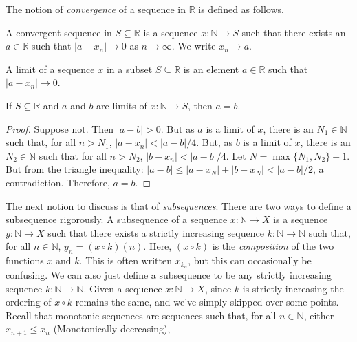     The notion of \textit{convergence} of a sequence
    in $\mathbb{R}$ is defined as follows.
    \begin{definition}
        A convergent sequence in $S\subseteq\mathbb{R}$
        is a sequence $x:\mathbb{N}\rightarrow{S}$
        such that there exists an $a\in\mathbb{R}$
        such that $|a-x_{n}|\rightarrow{0}$ as
        $n\rightarrow\infty$. We write
        $x_{n}\rightarrow{a}$.
    \end{definition}
    \begin{definition}
        A limit of a sequence $x$
        in a subset $S\subseteq\mathbb{R}$ is an
        element $a\in\mathbb{R}$ such that
        $|a-x_{n}|\rightarrow{0}$.
    \end{definition}
    \begin{theorem}
        If $S\subseteq\mathbb{R}$ and $a$ and $b$ are
        limits of $x:\mathbb{N}\rightarrow{S}$,
        then $a=b$.
    \end{theorem}
    \begin{proof}
        Suppose not. Then $|a-b|>0$. But as $a$ is a
        limit of $x$, there is an $N_{1}\in\mathbb{N}$
        such that, for all $n>N_{1}$,
        $|a-x_{n}|<|a-b|/4$. But, as $b$ is a limit
        of $x$, there is an $N_{2}\in\mathbb{N}$
        such that for all $n>N_{2}$,
        $|b-x_{n}|<|a-b|/4$. Let $N=\max\{N_{1},N_{2}\}+1$.
        But from the triangle inequality:
        $|a-b|\leq|a-x_{N}|+|b-x_{N}|<|a-b|/2$, a
        contradiction. Therefore, $a=b$.
    \end{proof}
    The next notion to discuss is that of
    \textit{subsequences}. There are two ways to define
    a subsequence rigorously. A subsequence of a sequence
    $x:\mathbb{N}\rightarrow{X}$ is a sequence 
    $y:\mathbb{N}\rightarrow{X}$ such that there exists
    a strictly increasing sequence
    $k:\mathbb{N}\rightarrow\mathbb{N}$ such that, for all
    $n\in\mathbb{N}$, $y_{n}=(x\circ{k})(n)$. Here,
    $(x\circ{k})$ is the \textit{composition} of
    the two functions $x$ and $k$. This is
    often written $x_{k_{n}}$, but this can occasionally
    be confusing. We can also just define a subsequence
    to be any strictly increasing sequence
    $k:\mathbb{N}\rightarrow\mathbb{N}$. Given a sequence
    $x:\mathbb{N}\rightarrow{X}$, since $k$ is strictly
    increasing the ordering of $x\circ{k}$
    remains the same, and we've simply skipped over
    some points. Recall that
    monotonic sequences are sequences such
    that, for all $n\in\mathbb{N}$, either
    $x_{n+1}\leq{x_{n}}$ (Monotonically decreasing),
